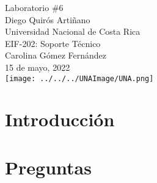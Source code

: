 \documentclass[stu, 12pt, letterpaper, donotrepeattitle, floatsintext, natbib, helv]{apa7}
\begin{document}
\begin{titlepage}
    \centering
    \vfill
    \LARGE Laboratorio \#6\\
    \vskip2cm
    \large Diego Quirós Artiñano \\
    Universidad Nacional de Costa Rica \\
    EIF-202: Soporte Técnico \\ 
    Carolina Gómez Fernández \\
    15 de mayo, 2022 \\
    \vfill
    \texttt{[image: ../../../UNAImage/UNA.png]} \\
    \vfill
    \vfill
\end{titlepage}

\addto{}
\tableofcontents
\setcounter{tocdepth}{2}
\newpage


\section*{Introducción}
{}

\section*{Preguntas}
{}
\end{document}
